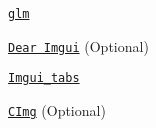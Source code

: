 \begin{DoxyItemize}
\item \href{https://glm.g-truc.net/0.9.8/index.html}{\tt glm}
\item \href{https://github.com/ocornut/imgui}{\tt Dear Imgui} (Optional)
\begin{DoxyItemize}
\item \href{https://github.com/ebachard/imgui_tabs}{\tt Imgui\+\_\+tabs}
\end{DoxyItemize}
\item \href{https://github.com/dtschump/CImg}{\tt C\+Img} (Optional) 
\end{DoxyItemize}
